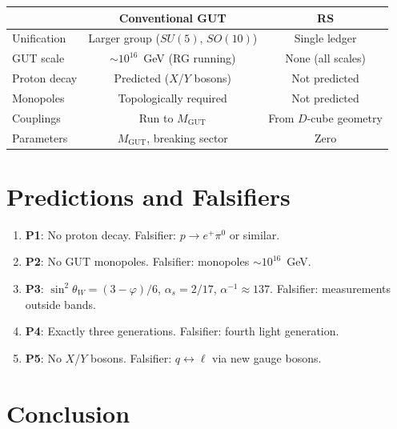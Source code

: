\documentclass[12pt,a4paper]{article}
\theoremstyle{definition}
\theoremstyle{remark}
\begin{document}
\begin{center}
\renewcommand{\arraystretch}{1.2}
\begin{tabular}{lcc}
\toprule
& \textbf{Conventional GUT} & \textbf{RS} \\
\midrule
Unification & Larger group ($SU(5)$, $SO(10)$) & Single ledger \\
GUT scale & $\sim 10^{16}$~GeV (RG running) & None (all scales) \\
Proton decay & Predicted ($X$/$Y$ bosons) & Not predicted \\
Monopoles & Topologically required & Not predicted \\
Couplings & Run to $M_{\mathrm{GUT}}$ & From $D$-cube geometry \\
Parameters & $M_{\mathrm{GUT}}$, breaking sector & Zero \\
\bottomrule
\end{tabular}
\end{center}

\section{Predictions and Falsifiers}
\label{sec:predictions}

\begin{enumerate}[label=\textbf{P\arabic*}.]
\item \textbf{P1}: No proton decay.  Falsifier: $p \to e^+ \pi^0$
  or similar.
\item \textbf{P2}: No GUT monopoles.  Falsifier: monopoles
  $\sim 10^{16}$~GeV.
\item \textbf{P3}: $\sin^2\theta_W = (3-\varphi)/6$, $\alpha_s =
  2/17$, $\alpha^{-1} \approx 137$.  Falsifier: measurements outside
  bands.
\item \textbf{P4}: Exactly three generations.  Falsifier: fourth
  light generation.
\item \textbf{P5}: No $X$/$Y$ bosons.  Falsifier: $q \leftrightarrow
  \ell$ via new gauge bosons.
\end{enumerate}

\section{Conclusion}
\label{sec:conclusion}
\end{document}
